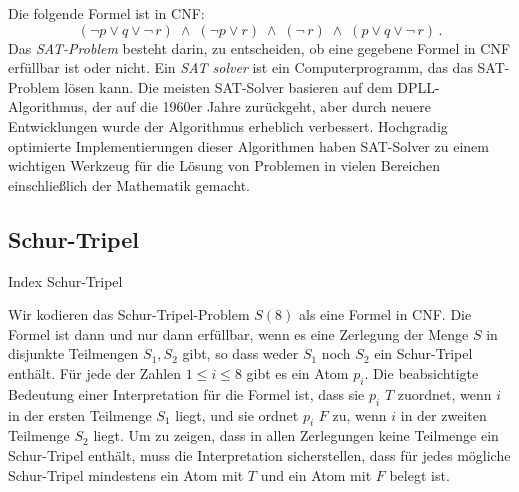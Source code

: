 Die folgende Formel ist in CNF:
\[
(\neg p \vee q \vee \neg \,r) \;\wedge\; (\neg p \vee r)
\;\wedge\; (\neg \,r)\;\wedge\;(p \vee q \vee \neg \,r)\,.
\]
Das \emph{SAT-Problem} besteht darin, zu entscheiden, ob eine gegebene Formel in CNF erfüllbar ist oder nicht. Ein \emph{SAT solver} ist ein Computerprogramm, das das SAT-Problem lösen kann. Die meisten SAT-Solver basieren auf dem DPLL-Algorithmus, der auf die 1960er Jahre zurückgeht, aber durch neuere Entwicklungen wurde der Algorithmus erheblich verbessert. Hochgradig optimierte Implementierungen dieser Algorithmen haben SAT-Solver zu einem wichtigen Werkzeug für die Lösung von Problemen in vielen Bereichen einschließlich der Mathematik gemacht.

\subsection{Schur-Tripel} Index {Schur-Tripel}

Wir kodieren das Schur-Tripel-Problem $S(8)$ als eine Formel in CNF. Die Formel ist dann und nur dann erfüllbar, wenn es eine Zerlegung der Menge $S$ in disjunkte Teilmengen $S_1,S_2$ gibt, so dass weder $S_1$ noch $S_2$ ein Schur-Tripel enthält. Für jede der Zahlen $1\leq i \leq 8$ gibt es ein Atom $p_i$. Die beabsichtigte Bedeutung einer Interpretation für die Formel ist, dass sie $p_i$ $T$ zuordnet, wenn $i$ in der ersten Teilmenge $S_1$ liegt, und sie ordnet $p_i$ $F$ zu, wenn $i$ in der zweiten Teilmenge $S_2$ liegt. Um zu zeigen, dass in allen Zerlegungen keine Teilmenge ein Schur-Tripel enthält, muss die Interpretation sicherstellen, dass für jedes mögliche Schur-Tripel mindestens ein Atom mit $T$ und ein Atom mit $F$ belegt ist. 

